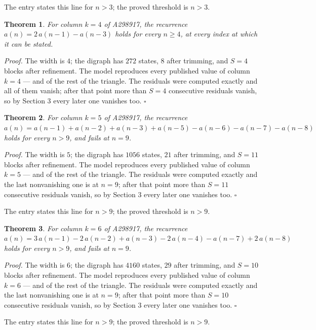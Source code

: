 \documentclass[11pt]{article}
\newtheorem{theorem}{Theorem}
\theoremstyle{definition}
\begin{document}
The entry states this line for $n > 3$; the proved threshold is $n > 3$.

\begin{theorem} For column $k = 4$ of A298917, the recurrence $a(n) = 2\,a(n-1) - a(n-3)$ holds for every $n \ge 4$, at every index at which it can be stated.\end{theorem}

{\itshape Proof.} The width is $4$; the digraph has $272$ states, $8$ after trimming, and $S = 4$ blocks after refinement. The model reproduces every published value of column $k = 4$ --- and of the rest of the triangle. The residuals were computed exactly and all of them vanish; after that point more than $S = 4$ consecutive residuals vanish, so by Section 3 every later one vanishes too. $\square$

\begin{theorem} For column $k = 5$ of A298917, the recurrence $a(n) = a(n-1) + a(n-2) + a(n-3) + a(n-5) - a(n-6) - a(n-7) - a(n-8)$ holds for every $n > 9$, and fails at $n = 9$.\end{theorem}

{\itshape Proof.} The width is $5$; the digraph has $1056$ states, $21$ after trimming, and $S = 11$ blocks after refinement. The model reproduces every published value of column $k = 5$ --- and of the rest of the triangle. The residuals were computed exactly and the last nonvanishing one is at $n = 9$; after that point more than $S = 11$ consecutive residuals vanish, so by Section 3 every later one vanishes too. $\square$

The entry states this line for $n > 9$; the proved threshold is $n > 9$.

\begin{theorem} For column $k = 6$ of A298917, the recurrence $a(n) = 3\,a(n-1) - 2\,a(n-2) + a(n-3) - 2\,a(n-4) - a(n-7) + 2\,a(n-8)$ holds for every $n > 9$, and fails at $n = 9$.\end{theorem}

{\itshape Proof.} The width is $6$; the digraph has $4160$ states, $29$ after trimming, and $S = 10$ blocks after refinement. The model reproduces every published value of column $k = 6$ --- and of the rest of the triangle. The residuals were computed exactly and the last nonvanishing one is at $n = 9$; after that point more than $S = 10$ consecutive residuals vanish, so by Section 3 every later one vanishes too. $\square$

The entry states this line for $n > 9$; the proved threshold is $n > 9$.
\end{document}
